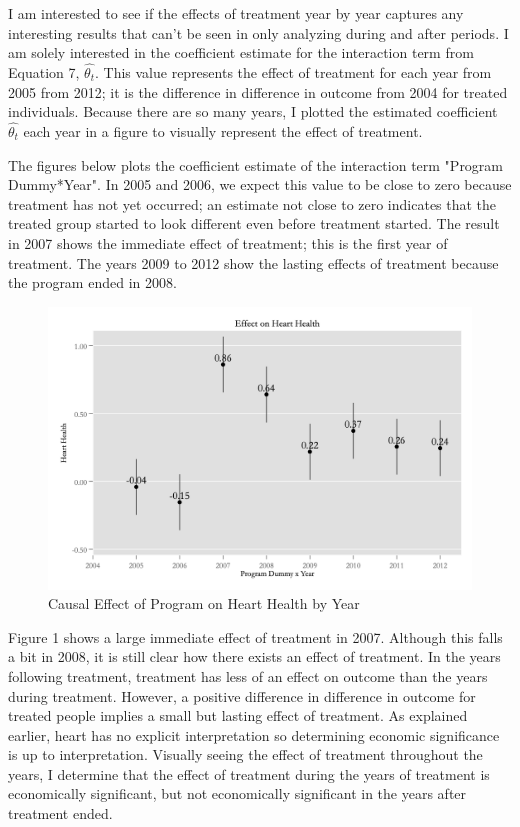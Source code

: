 \documentclass[a4paper]{article}
\begin{document}
I am interested to see if the effects of treatment year by year captures any interesting results that can't be seen in only analyzing during and after periods. I am solely interested in the coefficient estimate for the interaction term from Equation 7, $\hat{\theta_t}$. This value represents the effect of treatment for each year from 2005 from 2012; it is the difference in difference in outcome from 2004 for treated individuals. Because there are so many years, I plotted the estimated coefficient $\hat{\theta_t}$ each year in a figure to visually represent the effect of treatment. 


The figures below plots the coefficient estimate of the interaction term "Program Dummy*Year". In 2005 and 2006, we expect this value to be close to zero because treatment has not yet occurred; an estimate not close to zero indicates that the treated group started to look different even before treatment started. The result in 2007 shows the immediate effect of treatment; this is the first year of treatment. The years 2009 to 2012 show the lasting effects of treatment because the program ended in 2008. 

\begin{figure}[H]
\centering
 \includegraphics[width=.95\textwidth]{fig_year_heart.png}
 \caption{Causal Effect of Program on Heart Health by Year}
  \label{fig:SC}
 \end{figure}
 
Figure 1 shows a large immediate effect of treatment in 2007. Although this falls a bit in 2008, it is still clear how there exists an effect of treatment. In the years following treatment, treatment has less of an effect on outcome than the years during treatment. However, a positive difference in difference in outcome for treated people implies a small but lasting effect of treatment. As explained earlier, heart has no explicit interpretation so determining economic significance is up to interpretation. Visually seeing the effect of treatment throughout the years, I determine that the effect of treatment during the years of treatment is economically significant, but not economically significant in the years after treatment ended.
 
\end{document}

